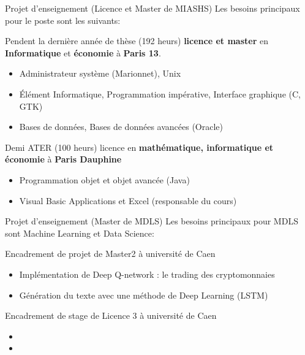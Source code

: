 \begin{frame}{Projet d’enseignement (Licence et Master de MIASHS)}
Les besoins principaux pour le poste sont les suivants:\\

\begin{block}{Pendent la dernière année de thèse (192 heurs)}
\textbf{licence et master} en \textbf{Informatique} et \textbf{économie} à %
\textbf{Paris 13}.
\begin{itemize}
 \item Administrateur système (Marionnet), Unix
 \item Élément Informatique, Programmation impérative, Interface graphique (C, GTK)
 \item Bases de données, Bases de données avancées (Oracle)
\end{itemize}
\end{block}
\begin{block}{Demi ATER (100 heurs)}
licence en \textbf{mathématique, informatique et économie} à %
\textbf{Paris Dauphine} 
\begin{itemize} 
\item Programmation objet et objet avancée (Java)
\item Visual Basic Applications et Excel (responsable du cours)
\end{itemize}

\end{block}

\end{frame}

\begin{frame}{Projet d’enseignement (Master de MDLS)} 
	Les besoins principaux pour MDLS sont Machine Learning et Data Science:

\begin{block}{Encadrement de projet de Master2 à université de Caen}
\begin{itemize}
 \item Implémentation de Deep Q-network : le trading des cryptomonnaies
 \item Génération du texte avec une méthode de Deep Learning (LSTM)
\end{itemize}
\end{block}

\begin{block}{Encadrement de stage de Licence 3 à université de Caen}
\begin{itemize}
	\item
	\item 
\end{itemize}
\end{block}

	
\end{frame}